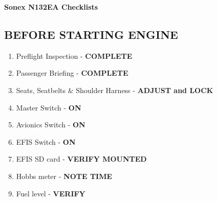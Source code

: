 \documentclass[14pt,letterpaper, twoside]{extarticle}
\begin{document}

\begin{center}
     \Large{\textbf{Sonex N132EA Checklists}} \\
\end{center}

\newlength{\len}






\subsection{BEFORE STARTING ENGINE}

\begin{enumerate}
\item Preflight Inspection - \textbf{COMPLETE}	
\item Passenger Briefing - \textbf{COMPLETE}	
\item Seats, Seatbelts \& Shoulder Harness - \textbf{ADJUST and LOCK}
\item Master Switch -  \textbf{ON}
\item Avionics Switch  -  \textbf{ON}
\item EFIS Switch  -  \textbf{ON}
\item EFIS SD card - \textbf{VERIFY MOUNTED}
\item Hobbs meter - \textbf{NOTE TIME}
\item Fuel level - \textbf{VERIFY}
\end{enumerate}
\end{document}
